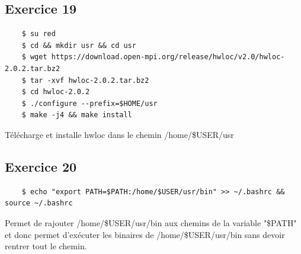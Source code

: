 \documentclass{report}
\begin{document}
\subsection{Exercice 19}

\begin{tcolorbox}
  \begin{verbatim}
    $ su red
    $ cd && mkdir usr && cd usr
    $ wget https://download.open-mpi.org/release/hwloc/v2.0/hwloc-2.0.2.tar.bz2
    $ tar -xvf hwloc-2.0.2.tar.bz2
    $ cd hwloc-2.0.2
    $ ./configure --prefix=$HOME/usr
    $ make -j4 && make install
  \end{verbatim}
\end{tcolorbox}
Télécharge et installe hwloc dans le chemin /home/\$USER/usr

\subsection{Exercice 20}
\begin{tcolorbox}
  \begin{verbatim}
    $ echo "export PATH=$PATH:/home/$USER/usr/bin" >> ~/.bashrc && source ~/.bashrc
  \end{verbatim}
\end{tcolorbox}

Permet de rajouter /home/\$USER/usr/bin aux chemins de la variable "\$PATH" et donc permet d'exécuter les binaires de /home/\$USER/usr/bin
sans devoir rentrer tout le chemin.
\end{document}
